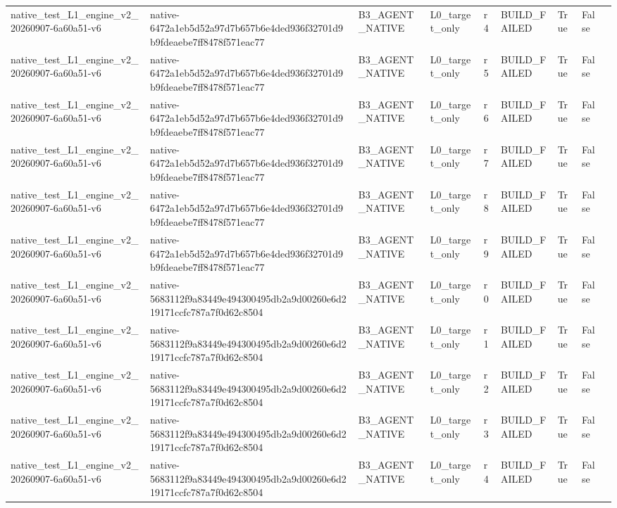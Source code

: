 \begin{tabular}{lllllllll}
native\_test\_L1\_engine\_v2\_20260907-6a60a51-v6 & native-6472a1eb5d52a97d7b657b6e4ded936f32701d9b9fdeaebe7ff8478f571eac77 & B3\_AGENT\_NATIVE & L0\_target\_only & r4 & BUILD\_FAILED & True & False &  \\
native\_test\_L1\_engine\_v2\_20260907-6a60a51-v6 & native-6472a1eb5d52a97d7b657b6e4ded936f32701d9b9fdeaebe7ff8478f571eac77 & B3\_AGENT\_NATIVE & L0\_target\_only & r5 & BUILD\_FAILED & True & False &  \\
native\_test\_L1\_engine\_v2\_20260907-6a60a51-v6 & native-6472a1eb5d52a97d7b657b6e4ded936f32701d9b9fdeaebe7ff8478f571eac77 & B3\_AGENT\_NATIVE & L0\_target\_only & r6 & BUILD\_FAILED & True & False &  \\
native\_test\_L1\_engine\_v2\_20260907-6a60a51-v6 & native-6472a1eb5d52a97d7b657b6e4ded936f32701d9b9fdeaebe7ff8478f571eac77 & B3\_AGENT\_NATIVE & L0\_target\_only & r7 & BUILD\_FAILED & True & False &  \\
native\_test\_L1\_engine\_v2\_20260907-6a60a51-v6 & native-6472a1eb5d52a97d7b657b6e4ded936f32701d9b9fdeaebe7ff8478f571eac77 & B3\_AGENT\_NATIVE & L0\_target\_only & r8 & BUILD\_FAILED & True & False &  \\
native\_test\_L1\_engine\_v2\_20260907-6a60a51-v6 & native-6472a1eb5d52a97d7b657b6e4ded936f32701d9b9fdeaebe7ff8478f571eac77 & B3\_AGENT\_NATIVE & L0\_target\_only & r9 & BUILD\_FAILED & True & False &  \\
native\_test\_L1\_engine\_v2\_20260907-6a60a51-v6 & native-5683112f9a83449e494300495db2a9d00260e6d219171ccfc787a7f0d62c8504 & B3\_AGENT\_NATIVE & L0\_target\_only & r0 & BUILD\_FAILED & True & False &  \\
native\_test\_L1\_engine\_v2\_20260907-6a60a51-v6 & native-5683112f9a83449e494300495db2a9d00260e6d219171ccfc787a7f0d62c8504 & B3\_AGENT\_NATIVE & L0\_target\_only & r1 & BUILD\_FAILED & True & False &  \\
native\_test\_L1\_engine\_v2\_20260907-6a60a51-v6 & native-5683112f9a83449e494300495db2a9d00260e6d219171ccfc787a7f0d62c8504 & B3\_AGENT\_NATIVE & L0\_target\_only & r2 & BUILD\_FAILED & True & False &  \\
native\_test\_L1\_engine\_v2\_20260907-6a60a51-v6 & native-5683112f9a83449e494300495db2a9d00260e6d219171ccfc787a7f0d62c8504 & B3\_AGENT\_NATIVE & L0\_target\_only & r3 & BUILD\_FAILED & True & False &  \\
native\_test\_L1\_engine\_v2\_20260907-6a60a51-v6 & native-5683112f9a83449e494300495db2a9d00260e6d219171ccfc787a7f0d62c8504 & B3\_AGENT\_NATIVE & L0\_target\_only & r4 & BUILD\_FAILED & True & False &  \\

\end{tabular}

